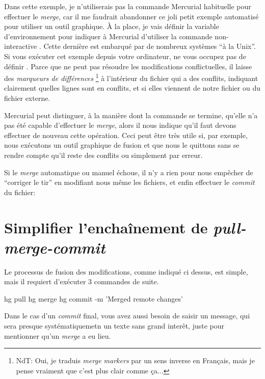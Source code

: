 Dans cette exemple, je n'utiliserais pas la commande Mercurial
habituelle  pour effectuer le \textit{merge},
car il me faudrait abandonner ce joli petit exemple automatisé
pour utiliser un outil graphique. À la place, je vais définir
la variable d'environnement  pour indiquer à 
Mercurial d'utiliser la commande non-interactive .
Cette dernière est embarqué par de nombreux systèmes ``à la Unix''.
Si vous exécuter cet exemple depuis votre ordinateur, ne vous
occupez pas de définir .
Parce que  ne peut pas résoudre les modifications
conflictuelles, il laisse des \emph{marqueurs de différences}
\footnote{NdT: Oui, je traduis \textit{merge markers} par un sens
inverse en Français, mais je pense vraiment que c'est plus clair 
comme ça...} à l'intérieur du fichier qui a des conflits, indiquant
clairement quelles lignes sont en conflits, et si elles viennent de
notre fichier ou du fichier externe.

Mercurial peut distinguer, à la manière dont la commande 
se termine, qu'elle n'a pas été capable d'effectuer le \textit{merge},
alors il nous indique qu'il faut devons effectuer de nouveau cette
opération. Ceci peut être très utile si, par exemple, nous exécutons un
outil graphique de fusion et que nous le quittons sans se rendre compte
qu'il reste des conflits ou simplement par erreur.

Si le \textit{merge} automatique ou manuel échoue, il n'y a rien pour
nous empêcher de ``corriger le tir'' en modifiant nous même les fichiers,
et enfin effectuer le \textit{commit} du fichier:

\section{Simplifier l'enchaînement de \textit{pull-merge-commit} }
\label{sec:tour-merge:fetch}

Le processus de fusion des modifications, comme indiqué ci dessus,
est simple, mais il requiert d'exécuter 3 commandes de suite.
\begin{codesample2}
  hg pull
  hg merge
  hg commit -m 'Merged remote changes'
\end{codesample2}
Dans le cas d'un \textit{commit} final, vous avez aussi besoin
de saisir un message, qui sera presque systématiquemetn un texte
sans grand interêt, juste pour mentionner qu'un \textit{merge} a
eu lieu.

